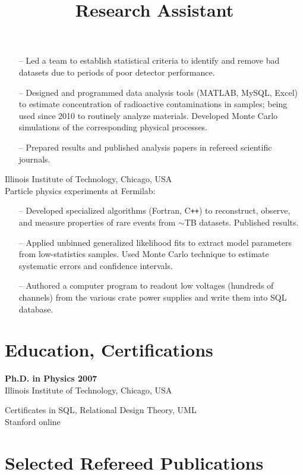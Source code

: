 \documentclass[overlapped, line, 10pt]{res}
\begin{document}
\begin{resume}
\begin{position}
\vspace{1ex}
\begin{itemize}
\item[--] Led a team to establish statistical criteria to identify and remove bad datasets due to periods of poor detector performance.
\item[--] Designed and programmed data analysis tools (MATLAB, MySQL, Excel) to estimate concentration of radioactive contaminations in samples; being used since 2010 to routinely analyze materials. Developed Monte Carlo simulations of the corresponding physical processes. 
\item[--] Prepared results and published analysis papers in refereed scientific journals.
\end{itemize}
\end{position}

\title{Research Assistant}
\begin{position}
Illinois Institute of Technology, Chicago, USA\\
Particle physics experiments at Fermilab:
\begin{itemize}
\item[--] Developed specialized algorithms (Fortran, C\texttt{++}) to reconstruct, observe, and measure properties of rare events from $\sim$TB datasets. Published results.
\item[--] Applied unbinned generalized likelihood fits to extract model parameters from low-statistics samples. Used Monte Carlo technique to estimate systematic errors and confidence intervals.
\item[--] Authored a computer program to readout low voltages (hundreds of channels) from the various crate power supplies and write them into SQL database.
\end{itemize}
\end{position}

\section{\sc Education, Certifications}
\textbf{Ph.D. in Physics \hfill 2007}\\
Illinois Institute of Technology, Chicago, USA

Certificates in SQL, Relational Design Theory, UML\\
Stanford online

\section{\sc Selected Refereed Publications}


\end{resume}
\end{document}

